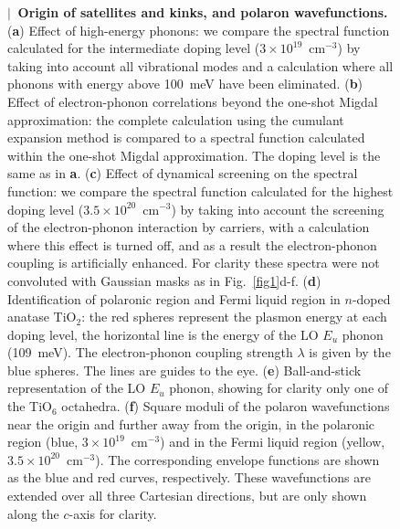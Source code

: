 \documentclass[12pt]{nature}
\begin{document}
\clearpage

 \begin{figure}
 \caption{\label{fig2}
 \textbf{$\!\!\bm|\,$ Origin of satellites and kinks, and polaron wavefunctions.}
 \normalfont(\textbf{a}) Effect of high-energy phonons: we compare the spectral function calculated for 
 the intermediate doping level ($3\times10^{19}$~cm$^{-3}$) by taking into account all vibrational modes 
 and a calculation where all phonons with energy above 100~meV have been eliminated. 
 (\textbf{b}) Effect of electron-phonon correlations beyond the one-shot Migdal approximation: 
 the complete calculation using the cumulant expansion method is compared to a spectral 
 function calculated within the one-shot Migdal approximation. The doping level is the same as in \textbf{a}.
 (\textbf{c}) Effect of dynamical screening on the spectral function: 
 we compare the spectral function calculated for the highest doping level
 ($3.5\times10^{20}$~cm$^{-3}$) by taking into account the screening of the electron-phonon 
 interaction by carriers, with a calculation where this effect is turned off, and as a result the 
 electron-phonon coupling is artificially enhanced. For clarity these spectra were not convoluted 
 with Gaussian masks as in Fig.~\ref{fig1}d-f. (\textbf{d}) Identification of polaronic 
 region and Fermi liquid region in $n$-doped anatase TiO$_2$: the red spheres represent the plasmon 
 energy at each doping level, the horizontal line is the energy of the LO $E_u$ phonon (109~meV). 
 The electron-phonon coupling strength $\lambda$ is given by the blue spheres. The lines are guides 
 to the eye. (\textbf{e}) Ball-and-stick representation of the LO $E_u$ phonon, showing for clarity only 
 one of the TiO$_6$ octahedra. 
 (\textbf{f}) Square moduli of the polaron wavefunctions near the origin and further away from the 
 origin, in the polaronic region (blue, $3\times10^{19}$~cm$^{-3}$) and in the Fermi liquid region 
 (yellow, $3.5\times10^{20}$~cm$^{-3}$). The corresponding envelope functions are shown 
 as the blue and red curves, respectively. These wavefunctions are extended over all three Cartesian 
 directions, but are only shown along the $c$-axis for clarity. }
 \end{figure}
\end{document}
